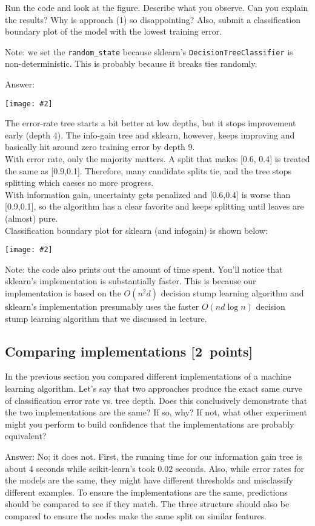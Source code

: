 \documentclass{article}
\newcommand{\blu}[1]{{\textcolor{blu}{#1}}}
\newenvironment{answer}{\par\begingroup\color{gre}Answer: }{\endgroup}
\let\ask\blu
\newcommand\pts[1]{\textcolor{pointscolour}{[#1~points]}}
\newcommand{\centerfig}[2]{\begin{center}\texttt{[image: \#2]}\end{center}}
\begin{document}
  Run the code and look at the figure.
  \ask{Describe what you observe. Can you explain the results?} Why is approach (1) so disappointing? Also, \ask{submit a classification boundary plot of the model with the lowest training error}.

  Note: we set the \verb|random_state| because sklearn's \texttt{DecisionTreeClassifier} is non-deterministic. This is probably
  because it breaks ties randomly.
    \begin{answer}
        \centerfig{0.7}{./figs/q6_5_tree_errors}
        The error-rate tree starts a bit better at low depths, but it stops improvement early (depth 4). The info-gain tree and sklearn, however, keeps improving and basically hit around zero training error by depth 9.\\ 
        With error rate, only the majority matters. A split that makes [0.6, 0.4] is treated the same as [0.9,0.1]. Therefore, many candidate splits tie, and the tree stops splitting which caeses no more progress.\\ 
        With information gain, uncertainty gets penalized and [0.6,0.4] is worse than [0.9,0.1], so the algorithm has a clear favorite and keeps splitting until leaves are (almost) pure. \\
        Classification boundary plot for sklearn (and infogain) is shown below:
        \centerfig{0.7}{./figs/q6_5_decisionBoundary}
    \end{answer}
  Note: the code also prints out the amount of time spent. You'll notice that sklearn's implementation is substantially faster. This is because
  our implementation is based on the $O(n^2d)$ decision stump learning algorithm and sklearn's implementation presumably uses the faster $O(nd\log n)$
  decision stump learning algorithm that we discussed in lecture.

  \subsection{Comparing implementations \pts{2}}

  In the previous section you compared different implementations of a machine learning algorithm. Let's say that two
  approaches produce the exact same curve of classification error rate vs. tree depth. Does this conclusively demonstrate
  that the two implementations are the same? If so, why? If not, what other experiment might you perform to build confidence
  that the implementations are probably equivalent?
    \begin{answer}
        No; it does not. First, the running time for our information gain tree is about 4 seconds while scikit-learn's took 0.02 seconds. Also, while error rates for the models are the same, they might have different thresholds and misclassify different examples. To ensure the implementations are the same, predictions should be compared to see if they match. The three structure should also be compared to ensure the nodes make the same split on similar features. 
    \end{answer}
\end{document}
